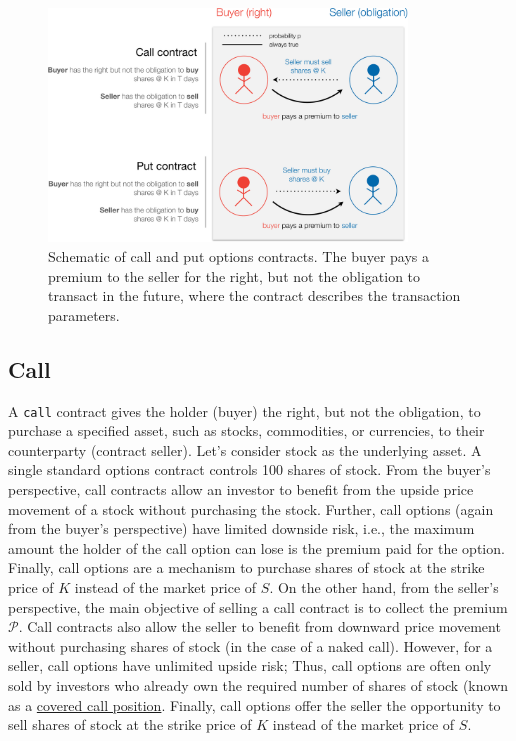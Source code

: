 \documentclass[11pt]{article}
\theoremstyle{definition}
\begin{document}
\begin{figure}[ht]
    \centering
    \includegraphics[width=0.85\textwidth]{./figs/Fig-Options-Table-Schematic.pdf}
    \caption{Schematic of call and put options contracts. The buyer pays a premium to the seller for the right, but 
	not the obligation to transact in the future, where the contract describes the transaction parameters.}\label{fig:options-schematic}
\end{figure}

\subsection{Call}
A \texttt{call} contract gives the holder (buyer) the right, but not the obligation, to purchase a specified asset, 
such as stocks, commodities, or currencies, to their counterparty (contract seller). 
Let's consider stock as the underlying asset. A single standard options contract controls 100 shares of stock. 
From the buyer's perspective, call contracts allow an investor to benefit from the upside price movement of a stock without purchasing the stock.
Further, call options (again from the buyer's perspective) have limited downside risk, i.e., the maximum amount the holder of the call option can lose 
is the premium paid for the option. Finally, call options are a mechanism to purchase shares of stock at the strike price of $K$ instead of the market price of $S$. 
On the other hand, from the seller's perspective, the main objective of selling a call contract is to collect the premium $\mathcal{P}$. 
Call contracts also allow the seller to benefit from downward price movement without purchasing shares of stock (in the case of a naked call).
However, for a seller, call options have unlimited upside risk; 
Thus, call options are often only sold by investors who already own the required number of shares of stock 
(known as a \href{https://www.investopedia.com/terms/c/coveredcall.asp}{covered call position}. 
Finally, call options offer the seller the opportunity to sell shares of stock at the strike price of $K$ instead of the market price of $S$.
\end{document}

